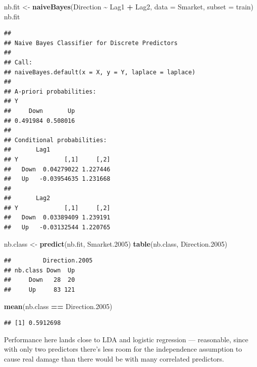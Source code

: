 \documentclass[
  11pt,
]{article}
\newenvironment{Shaded}{\begin{snugshade}}{\end{snugshade}}
\newcommand{\AttributeTok}[1]{\textcolor[rgb]{0.13,0.29,0.53}{#1}}
\newcommand{\FloatTok}[1]{\textcolor[rgb]{0.00,0.00,0.81}{#1}}
\newcommand{\FunctionTok}[1]{\textcolor[rgb]{0.13,0.29,0.53}{\textbf{#1}}}
\newcommand{\NormalTok}[1]{#1}
\newcommand{\OtherTok}[1]{\textcolor[rgb]{0.56,0.35,0.01}{#1}}
\newcommand{\SpecialCharTok}[1]{\textcolor[rgb]{0.81,0.36,0.00}{\textbf{#1}}}
\begin{document}
\begin{Shaded}
\begin{Highlighting}[]
\NormalTok{nb.fit }\OtherTok{\textless{}{-}} \FunctionTok{naiveBayes}\NormalTok{(Direction }\SpecialCharTok{\textasciitilde{}}\NormalTok{ Lag1 }\SpecialCharTok{+}\NormalTok{ Lag2, }\AttributeTok{data =}\NormalTok{ Smarket, }\AttributeTok{subset =}\NormalTok{ train)}
\NormalTok{nb.fit}
\end{Highlighting}
\end{Shaded}

\begin{verbatim}
## 
## Naive Bayes Classifier for Discrete Predictors
## 
## Call:
## naiveBayes.default(x = X, y = Y, laplace = laplace)
## 
## A-priori probabilities:
## Y
##     Down       Up 
## 0.491984 0.508016 
## 
## Conditional probabilities:
##       Lag1
## Y             [,1]     [,2]
##   Down  0.04279022 1.227446
##   Up   -0.03954635 1.231668
## 
##       Lag2
## Y             [,1]     [,2]
##   Down  0.03389409 1.239191
##   Up   -0.03132544 1.220765
\end{verbatim}

\begin{Shaded}
\begin{Highlighting}[]
\NormalTok{nb.class }\OtherTok{\textless{}{-}} \FunctionTok{predict}\NormalTok{(nb.fit, Smarket}\FloatTok{.2005}\NormalTok{)}
\FunctionTok{table}\NormalTok{(nb.class, Direction}\FloatTok{.2005}\NormalTok{)}
\end{Highlighting}
\end{Shaded}

\begin{verbatim}
##         Direction.2005
## nb.class Down  Up
##     Down   28  20
##     Up     83 121
\end{verbatim}

\begin{Shaded}
\begin{Highlighting}[]
\FunctionTok{mean}\NormalTok{(nb.class }\SpecialCharTok{==}\NormalTok{ Direction}\FloatTok{.2005}\NormalTok{)}
\end{Highlighting}
\end{Shaded}

\begin{verbatim}
## [1] 0.5912698
\end{verbatim}

Performance here lands close to LDA and logistic regression ---
reasonable, since with only two predictors there's less room for the
independence assumption to cause real damage than there would be with
many correlated predictors.
\end{document}
